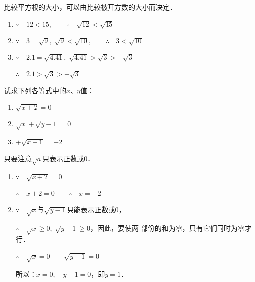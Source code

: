 \begin{solution}
    比较平方根的大小，可以由比较被开方数的大小而决定．
\begin{enumerate}
    \item $\because\quad 12<15,\qquad \therefore\quad \sqrt{12}<\sqrt{15}$
    \item  $\because\quad 3=\sqrt{9},\; \sqrt{9}<\sqrt{10},\qquad \therefore\quad 3<\sqrt{10}$
    \item  $\because\quad 2.1=\sqrt{4.41},\;\sqrt{4.41}>\sqrt{3}>-\sqrt{3}$
    
    $\therefore\quad 2.1>\sqrt{3}>-\sqrt{3}$
\end{enumerate}

\end{solution}




\begin{example}
    试求下列各等式中的$x$、$y$值：
    \begin{enumerate}
        \item $\sqrt{x+2}=0$
        \item $\sqrt{x}+\sqrt{y-1}=0$
        \item $+\sqrt{x-1}=-2$
    \end{enumerate}
\end{example}


\begin{solution}
只要注意$\sqrt{a}$只表示正数或0．
\begin{enumerate}
    \item $\because\quad \sqrt{x+2}=0$
    
    $\therefore\quad x+2=0\qquad \therefore\quad x=-2$  
    \item $\because\quad \sqrt{x}$与$\sqrt{y-1}$只能表示正数或0，
    
    $\therefore\quad \sqrt{x}\ge 0, \; \sqrt{y-1}\ge 0$，因此，要使两
    部份的和为零，只有它们同时为零才行．

    $\therefore\quad\sqrt{x}=0\qquad \sqrt{y-1}=0$

    所以：$x=0,\quad y-1=0$，即$y=1$．
\end{enumerate}
\end{solution}

